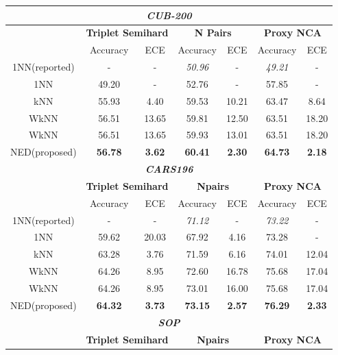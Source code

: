 \documentclass{article}
\begin{document}
\begin{table*}[h]
	\begin{center}
		\begin{tabular}{|c|c|c|c|c|c|c|}
			\hline
			\multicolumn{7}{|c|}{\textbf{\emph{CUB-200}}} \\
			\hline
			& \multicolumn{2}{|c|}{\textbf{Triplet Semihard}} & \multicolumn{2}{|c|}{\textbf{N Pairs}} & \multicolumn{2}{|c|}{\textbf{Proxy NCA}}  \\
			\hline
			& Accuracy & ECE & Accuracy & ECE  & Accuracy & ECE    \\
			\hline
			1NN(reported) & - & - & \emph{50.96} & - & \emph{49.21} & -  \\
			\hline
			1NN & 49.20 & - & 52.76 & - & 57.85 & -  \\
			\hline
			kNN & 55.93 & 4.40 & 59.53 & 10.21 & 63.47 & 8.64 \\
			\hline
			WkNN \cite{b70} & 56.51 & 13.65 & 59.81 & 12.50 & 63.51 &  18.20 \\
			\hline
			WkNN \cite{b69} & 56.51 & 13.65 & 59.93 & 13.01 & 63.51 &  18.20 \\
			\hline
			NED(proposed) & \textbf{56.78} &\textbf{3.62}  & \textbf{60.41} & \textbf{2.30} & \textbf{64.73} & \textbf{2.18}  \\
			\hline
			\multicolumn{7}{|c|}{\textbf{\emph{CARS196}}} \\
			\hline
			& \multicolumn{2}{|c|}{\textbf{Triplet Semihard}} & \multicolumn{2}{|c|}{\textbf{Npairs}} & \multicolumn{2}{|c|}{\textbf{Proxy NCA}} \\
			\hline
			& Accuracy & ECE & Accuracy & ECE  & Accuracy & ECE  \\
			\hline
			1NN(reported) & - & - & \emph{71.12} & - & \emph{73.22} & -  \\
			\hline
			1NN & 59.62 & 20.03  & 67.92 & 4.16 & 73.28 & - \\
			\hline
			kNN & 63.28 & 3.76 & 71.59 & 6.16  & 74.01  &  12.04  \\
			\hline
			WkNN \cite{b70}  & 64.26 & 8.95 & 72.60 & 16.78 & 75.68 &  17.04 \\
			\hline
			WkNN \cite{b69} & 64.26 & 8.95 & 73.01 & 16.00 & 75.68  & 17.04  \\
			\hline
			NED(proposed) & \textbf{64.32} & \textbf{3.73} & \textbf{73.15} & \textbf{2.57} & \textbf{76.29} & \textbf{2.33}   \\
			\hline
			\multicolumn{7}{|c|}{\textbf{\emph{SOP}}} \\
			\hline
			& \multicolumn{2}{|c|}{\textbf{Triplet Semihard}} & \multicolumn{2}{|c|}{\textbf{Npairs}} & \multicolumn{2}{|c|}{\textbf{Proxy NCA}}  \\

\end{tabular}
\end{center}
\end{table*}
\end{document}
